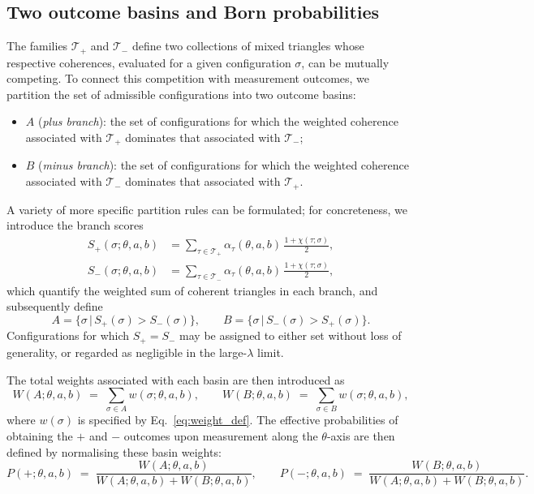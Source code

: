 \documentclass[11pt,a4paper]{article}
\numberwithin{equation}{section}
\begin{document}
\subsection{Two outcome basins and Born probabilities}
\label{subsec:basins_Born}

The families $\mathcal{T}_+$ and $\mathcal{T}_-$ define two collections of mixed triangles whose respective coherences, evaluated for a given configuration $\sigma$, can be mutually competing. To connect this competition with measurement outcomes, we partition the set of admissible configurations into two outcome basins:
\begin{itemize}
  \item $A$ (\emph{plus branch}): the set of configurations for which the weighted coherence associated with $\mathcal{T}_+$ dominates that associated with $\mathcal{T}_-$;
  \item $B$ (\emph{minus branch}): the set of configurations for which the weighted coherence associated with $\mathcal{T}_-$ dominates that associated with $\mathcal{T}_+$.
\end{itemize}
A variety of more specific partition rules can be formulated; for concreteness, we introduce the branch scores
\begin{align}
  S_+(\sigma;\theta,a,b)
  &= \sum_{\tau\in\mathcal{T}_+} \alpha_\tau(\theta,a,b)\,\frac{1+\chi(\tau;\sigma)}{2},\\
  S_-(\sigma;\theta,a,b)
  &= \sum_{\tau\in\mathcal{T}_-} \alpha_\tau(\theta,a,b)\,\frac{1+\chi(\tau;\sigma)}{2},
\end{align}
which quantify the weighted sum of coherent triangles in each branch, and subsequently define
\begin{equation}
  A = \{\sigma \,\big|\, S_+(\sigma) > S_-(\sigma)\},
  \qquad
  B = \{\sigma \,\big|\, S_-(\sigma) > S_+(\sigma)\}.
\end{equation}
Configurations for which $S_+ = S_-$ may be assigned to either set without loss of generality, or regarded as negligible in the large-$\lambda$ limit.

The total weights associated with each basin are then introduced as
\begin{equation}
  W(A;\theta,a,b)
  \;=\;
  \sum_{\sigma\in A} w(\sigma;\theta,a,b),
  \qquad
  W(B;\theta,a,b)
  \;=\;
  \sum_{\sigma\in B} w(\sigma;\theta,a,b),
  \label{eq:WA_WB_def}
\end{equation}
where $w(\sigma)$ is specified by Eq.~\eqref{eq:weight_def}. The effective probabilities of obtaining the $+$ and $-$ outcomes upon measurement along the $\theta$-axis are then defined by normalising these basin weights:
\begin{equation}
  P(+;\theta,a,b) \;=\;
  \frac{W(A;\theta,a,b)}{W(A;\theta,a,b)+W(B;\theta,a,b)},
  \qquad
  P(-;\theta,a,b) \;=\;
  \frac{W(B;\theta,a,b)}{W(A;\theta,a,b)+W(B;\theta,a,b)}.
  \label{eq:Pplus_Pminus_def}
\end{equation}
\end{document}
